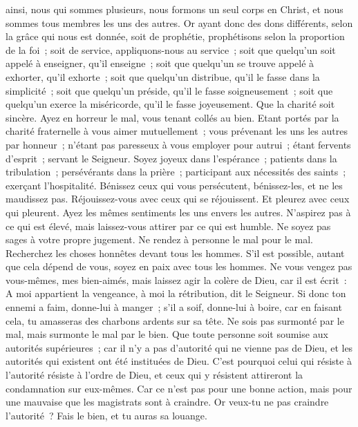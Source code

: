 \begin{multicols}{2}
ainsi, nous qui sommes plusieurs, nous formons un seul corps en Christ, et nous sommes tous membres les uns des autres.
Or ayant donc des dons différents, selon la grâce qui nous est donnée, soit de prophétie, prophétisons selon la proportion de la foi~;
soit de service, appliquons-nous au service~; soit que quelqu'un soit appelé à enseigner, qu'il enseigne~;
soit que quelqu'un se trouve appelé à exhorter, qu'il exhorte~; soit que quelqu'un distribue, qu'il le fasse dans la simplicité~; soit que quelqu'un préside, qu'il le fasse soigneusement~; soit que quelqu'un exerce la miséricorde, qu'il le fasse joyeusement.
Que la charité soit sincère. Ayez en horreur le mal, vous tenant collés au bien.
Etant portés par la charité fraternelle à vous aimer mutuellement~; vous prévenant les uns les autres par honneur~;
n'étant pas paresseux à vous employer pour autrui~; étant fervents d'esprit~; servant le Seigneur.
Soyez joyeux dans l'espérance~; patients dans la tribulation~; persévérants dans la prière~;
participant aux nécessités des saints~; exerçant l'hospitalité.
Bénissez ceux qui vous persécutent, bénissez-les, et ne les maudissez pas.
Réjouissez-vous avec ceux qui se réjouissent. Et pleurez avec ceux qui pleurent.
Ayez les mêmes sentiments les uns envers les autres. N'aspirez pas à ce qui est élevé, mais laissez-vous attirer par ce qui est humble. Ne soyez pas sages à votre propre jugement.
Ne rendez à personne le mal pour le mal. Recherchez les choses honnêtes devant tous les hommes.
S'il est possible, autant que cela dépend de vous, soyez en paix avec tous les hommes.
Ne vous vengez pas vous-mêmes, mes bien-aimés, mais laissez agir la colère de Dieu, car il est écrit~: A moi appartient la vengeance, à moi la rétribution, dit le Seigneur.
Si donc ton ennemi a faim, donne-lui à manger~; s'il a soif, donne-lui à boire, car en faisant cela, tu amasseras des charbons ardents sur sa tête.
Ne sois pas surmonté par le mal, mais surmonte le mal par le bien.
\VerseOne{}Que toute personne soit soumise aux autorités supérieures~; car il n'y a pas d'autorité qui ne vienne pas de Dieu, et les autorités qui existent ont été instituées de Dieu.
C'est pourquoi celui qui résiste à l'autorité résiste à l'ordre de Dieu, et ceux qui y résistent attireront la condamnation sur eux-mêmes.
Car ce n'est pas pour une bonne action, mais pour une mauvaise que les magistrats sont à craindre. Or veux-tu ne pas craindre l'autorité~? Fais le bien, et tu auras sa louange.

\end{multicols}
